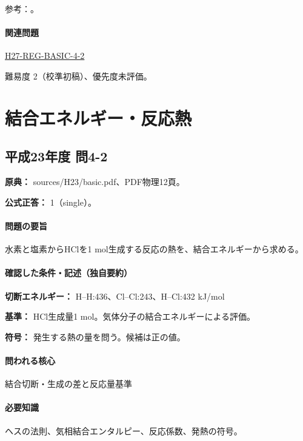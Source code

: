 \par 参考：\cite{iupac_oxidation_state}。

\paragraph{関連問題} \hyperref[q:h27-reg-basic-4-2]{H27-REG-BASIC-4-2}

\par 難易度 2（校準初稿）、優先度未評価。

\section{結合エネルギー・反応熱}

\subsection{平成23年度 問4-2}
\label{q:h23-reg-basic-4-2}

\noindent\textbf{原典：} sources/H23/basic.pdf、PDF物理12頁。

\textbf{公式正答：} 1（single）。

\paragraph{問題の要旨} 水素と塩素からHClを1 mol生成する反応の熱を、結合エネルギーから求める。

\paragraph{確認した条件・記述（独自要約）}\mbox{}\par

\noindent\textbf{切断エネルギー：} H–H:436、Cl–Cl:243、H–Cl:432 kJ/mol\par

\noindent\textbf{基準：} HCl生成量1 mol。気体分子の結合エネルギーによる評価。\par

\noindent\textbf{符号：} 発生する熱の量を問う。候補は正の値。\par

\paragraph{問われる核心} 結合切断・生成の差と反応量基準

\paragraph{必要知識} ヘスの法則、気相結合エンタルピー、反応係数、発熱の符号。

